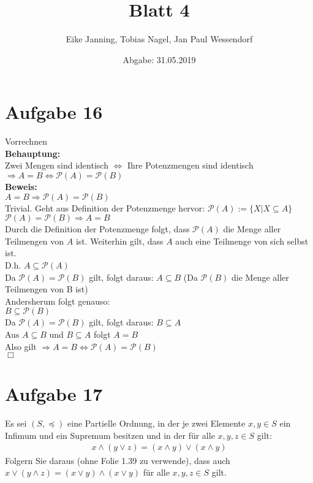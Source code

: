 \documentclass[paper = a4, ngerman]{scrartcl}
\title{Blatt 4}
\author{Eike Janning, Tobias Nagel, Jan Paul Wessendorf}
\date{Abgabe: 31.05.2019}
\begin{document}
	\maketitle
	\hrulefill
	
	\section*{Aufgabe 16}
	Vorrechnen\\
	\textbf{Behauptung:}\\
	Zwei Mengen sind identisch $\Leftrightarrow$ Ihre Potenzmengen sind identisch\\
	
	$\Rightarrow A = B \Leftrightarrow \mathcal{P}(A) = \mathcal{P}(B) $\\
	
	\textbf{Beweis:}\\
	$ A = B \Rightarrow \mathcal{P}(A) = \mathcal{P}(B) $\\
	Trivial. Geht aus Definition der Potenzmenge hervor: $\mathcal{P}(A) := \{ X | X \subseteq A\}$\\
	
	$\mathcal{P}(A) = \mathcal{P}(B) \Rightarrow A = B$\\
	
	Durch die Definition der Potenzmenge folgt, dass $\mathcal{P}(A)$ die Menge aller Teilmengen von $A$ ist. Weiterhin gilt, dass $A$ auch eine Teilmenge von sich selbst ist.\\
	D.h. $A \subseteq \mathcal{P}(A)$\\
	Da $\mathcal{P}(A) = \mathcal{P}(B)$ gilt, folgt daraus: $A \subseteq B$  (Da $\mathcal{P}(B)$ die Menge aller Teilmengen von B ist)\\
	
	Andersherum folgt genauso:\\
	$B \subseteq \mathcal{P}(B)$\\
	Da $\mathcal{P}(A) = \mathcal{P}(B)$ gilt, folgt daraus: $B \subseteq A$\\
	
	Aus $A \subseteq B$ und $B \subseteq A$ folgt $A = B$\\
	
	Also gilt 	$\Rightarrow A = B \Leftrightarrow \mathcal{P}(A) = \mathcal{P}(B) $\\
	
	\hfil$\Box$
	\section*{Aufgabe 17}
	Es sei $(S,\preccurlyeq)$ eine Partielle Ordnung, in der je zwei Elemente $x,y\in S$ ein Infimum und ein Supremum besitzen und in der für alle $x,y,z \in S$ gilt:
	\begin{align}
		x \wedge (y \vee z) = (x \wedge y) \vee (x \wedge y)
	\end{align}
	Folgern Sie daraus (ohne Folie 1.39 zu verwende), dass auch $x \vee (y \wedge z) = (x \vee y) \wedge (x \vee y)$ für alle $x,y,z \in S$ gilt.
	
\end{document}

